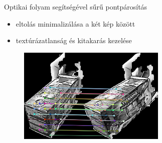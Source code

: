 \begin{frame}{Optikai folyam segítségével sűrű pontpárosítás}
\begin{itemize}
\item eltolás minimalizálása a két kép között
\item textúrázatlanság és kitakarás kezelése
\end{itemize}

\begin{figure}[tbh]
\centering
\includegraphics[width=200pt]{figures/vis_full.png}
\end{figure}


\end{frame}


